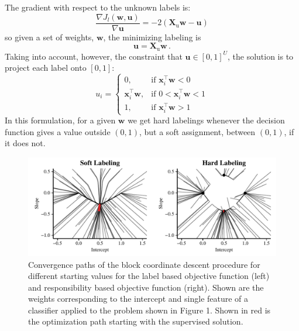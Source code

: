 \documentclass[conference,a4paper,10pt]{IEEEtran}\usepackage[]{graphicx}\usepackage[]{color}
\makeatletter
\def\maxwidth{ %
  \ifdim\Gin@nat@width>\linewidth
    \linewidth
  \else
    \Gin@nat@width
  \fi
}
\newenvironment{knitrout}{}{} %
\makeatother
\begin{document}
The gradient with respect to the unknown labels is:
$$
\frac{\nabla J_l(\mathbf{w},\mathbf{u})}{\nabla \mathbf{u}} = -2 (\mathbf{X}_\text{u} \mathbf{w} - \mathbf{u})
$$
so given a set of weights, $\mathbf{w}$, the minimizing labeling is 
$$\mathbf{u} = \mathbf{X}_\text{u} \mathbf{w} \,.$$
Taking into account, however, the constraint that $\mathbf{u} \in [0,1]^U$, the solution is to project each label onto $[0,1]$:
$$
u_i = 
\begin{cases}
0, & \text{if } \mathbf{x}_i^\top \mathbf{w} < 0\\
\mathbf{x}_i^\top \mathbf{w}, & \text{if } 0 < \mathbf{x}_i^\top \mathbf{w} < 1\\
1, & \text{if } \mathbf{x}_i^\top \mathbf{w} > 1
\end{cases}
$$
In this formulation, for a given $\mathbf{w}$ we get hard labelings whenever the decision function gives a value outside $(0,1)$, but a soft assignment, between $(0,1)$, if it does not.


\begin{knitrout}
\color{fgcolor}\begin{figure}
\includegraphics[width=\maxwidth]{figure/attraction1d-1} \caption[Convergence paths of the block coordinate descent procedure for different starting values for the label based objective function (left) and responsibility based objective function (right)]{Convergence paths of the block coordinate descent procedure for different starting values for the label based objective function (left) and responsibility based objective function (right). Shown are the weights corresponding to the intercept and single feature of a classifier applied to the problem shown in Figure 1. Shown in red is the optimization path starting with the supervised solution.}\label{fig:attraction1d}
\end{figure}


\end{knitrout}
\end{document}
